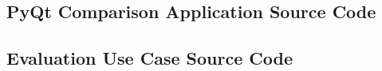 \clearpage


\subsection{PyQt Comparison Application Source Code}



\clearpage


\subsection{Evaluation Use Case Source Code}


